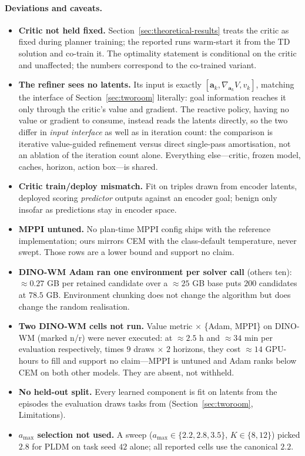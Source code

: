 \paragraph{Deviations and caveats.}
\begin{itemize}\itemsep1pt \parskip0pt 
  \item \textbf{Critic not held fixed.} Section~\ref{sec:theoretical-results}
    treats the critic as fixed during planner training; the reported runs
    warm-start it from the TD solution and co-train it. The optimality
    statement is conditional on the critic and unaffected; the numbers
    correspond to the co-trained variant.
  \item \textbf{The refiner sees no latents.} Its input is exactly
    $[\mathbf a_k, \nabla_{\!\mathbf a_k}V, v_k]$, matching the interface of
    Section~\ref{sec:tworoom} literally: goal information reaches it only
    through the critic's value and gradient. The reactive policy, having no
    value or gradient to consume, instead reads the latents directly, so the
    two differ in \emph{input interface} as well as in iteration count: the
    comparison is iterative value-guided refinement versus direct single-pass
    amortisation, not an ablation of the iteration count alone. Everything
    else---critic, frozen model, caches, horizon, action box---is shared.
  \item \textbf{Critic train/deploy mismatch.} Fit on triples drawn from
    encoder latents, deployed scoring \emph{predictor} outputs against an
    encoder goal; benign only insofar as predictions stay in encoder space.
  \item \textbf{MPPI untuned.} No plan-time MPPI config ships with the
    reference implementation; ours mirrors CEM with the class-default
    temperature, never swept. Those rows are a lower bound and support no
    claim.
  \item \textbf{DINO-WM Adam ran one environment per solver call} (others
    ten): $\approx\!0.27$ GB per retained candidate over a $\approx\!25$ GB
    base puts $200$ candidates at $78.5$ GB. Environment chunking does not
    change the algorithm but does change the random realisation.
  \item \textbf{Two DINO-WM cells not run.} Value metric $\times$ \{Adam,
    MPPI\} on DINO-WM (marked n/r) were never executed: at
    $\approx\!2.5$ h and $\approx\!34$ min per evaluation respectively, times
    $9$ draws $\times$ $2$ horizons, they cost ${\approx}14$ GPU-hours to fill and
    support no claim---MPPI is untuned and Adam ranks below CEM on both other
    models. They are absent, not withheld.
  \item \textbf{No held-out split.} Every learned component is fit on
    latents from the episodes the evaluation draws tasks from
    (Section~\ref{sec:tworoom}, Limitations).
  \item \textbf{$a_{\max}$ selection not used.} A sweep
    ($a_{\max}\!\in\!\{2.2,2.8,3.5\}$, $K\!\in\!\{8,12\}$) picked $2.8$ for
    PLDM on task seed $42$ alone; all reported cells use the canonical $2.2$.
\end{itemize}

